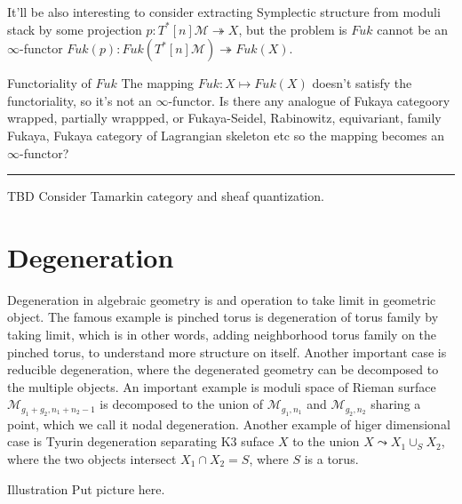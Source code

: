\documentclass{article}
\begin{document}
\noindent
It'll be also interesting to consider extracting Symplectic structure from moduli stack by some projection 
$p:T^*[n]\mathcal{M} \twoheadrightarrow X$, but the problem is $Fuk$ cannot be an $\infty$-functor
$Fuk(p):Fuk(T^*[n]\mathcal{M}) \twoheadrightarrow Fuk(X)$. \\


\begin{question}{Functoriality of $Fuk$}{}
The mapping $Fuk: X\mapsto Fuk(X)$ doesn't satisfy the functoriality, so it's not an $\infty$-functor. 
Is there any analogue of Fukaya categoory wrapped, partially wrappped, or Fukaya-Seidel,
Rabinowitz, equivariant, family Fukaya, Fukaya category of Lagrangian skeleton etc so the mapping becomes an $\infty$-functor?
\end{question}



\vspace{0.5cm}
\noindent\rule{\textwidth}{0.4pt}
\vspace{0.5cm}

\noindent
TBD Consider Tamarkin category and sheaf quantization. \\






\section {Degeneration}

\noindent
Degeneration in algebraic geometry is and operation to take limit in geometric object. 
The famous example is pinched torus is degeneration of torus family by taking limit, 
which is in other words, adding neighborhood torus family on the pinched torus, to understand more structure on itself.
Another important case is reducible degeneration, where the degenerated geometry can be decomposed to the multiple objects.
An important example is moduli space of Rieman surface $\mathcal{M}_{g_1+g_2, n_1+n_2-1}$
is decomposed to the union of $\mathcal{M}_{g_1, n_1}$ and $\mathcal{M}_{g_2, n_2}$ sharing a point, which we call it nodal degeneration.
Another example of higer dimensional case is Tyurin degeneration separating K3 suface $X$ to the union $X\leadsto X_1\cup_S X_2$,
where the two objects intersect $X_1\cap X_2=S$, where $S$ is a torus. \\

\begin{example}{Illustration}{}
Put picture here.
\end{example}
\end{document}
